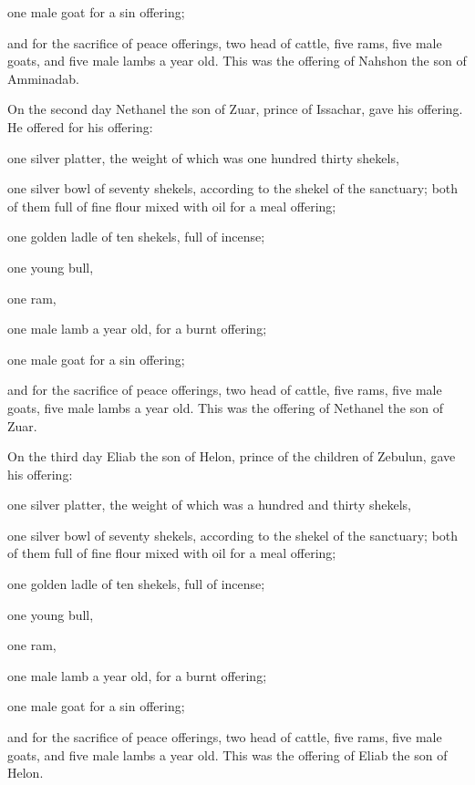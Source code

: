 {\par }{\PP {}one male goat for a sin offering;
\par }{\PP {}and for the sacrifice of peace offerings, two head of cattle, five rams, five male goats, and five male lambs a year old. This was the offering of Nahshon the son of Amminadab.
\par }{\PP {}On the second day Nethanel the son of Zuar, prince of Issachar, gave his offering.
He offered for his offering:
\par }{\PP one silver platter, the weight of which was one hundred thirty shekels,
\par }{\PP one silver bowl of seventy shekels, according to the shekel of the sanctuary; both of them full of fine flour mixed with oil for a meal offering;
\par }{\PP {}one golden ladle of ten shekels, full of incense;
\par }{\PP {}one young bull,
\par }{\PP one ram,
\par }{\PP one male lamb a year old, for a burnt offering;
\par }{\PP {}one male goat for a sin offering;
\par }{\PP {}and for the sacrifice of peace offerings, two head of cattle, five rams, five male goats, five male lambs a year old. This was the offering of Nethanel the son of Zuar.
\par }{\PP {}On the third day Eliab the son of Helon, prince of the children of Zebulun,
gave his offering:
\par }{\PP one silver platter, the weight of which was a hundred and thirty shekels,
\par }{\PP one silver bowl of seventy shekels, according to the shekel of the sanctuary; both of them full of fine flour mixed with oil for a meal offering;
\par }{\PP {}one golden ladle of ten shekels, full of incense;
\par }{\PP {}one young bull,
\par }{\PP one ram,
\par }{\PP one male lamb a year old, for a burnt offering;
\par }{\PP {}one male goat for a sin offering;
\par }{\PP {}and for the sacrifice of peace offerings, two head of cattle, five rams, five male goats, and five male lambs a year old. This was the offering of Eliab the son of Helon.
}
